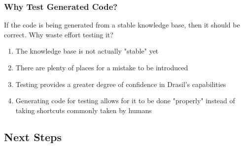 \documentclass{beamer}
\begin{document}
\begin{frame}
    \frametitle{Why Test Generated Code?}
    If the code is being generated from a stable knowledge base,
    then it should be correct. Why waste effort testing it?
    \begin{enumerate}
        \item<2-> The knowledge base is not actually "stable" yet
        \item<3-> There are plenty of places for a mistake to be introduced
        \item<4-> Testing provides a greater degree of confidence in
            Drasil's capabilities
        \item<5-> Generating code for testing allows for it to be done
            "properly" instead of taking shortcuts commonly taken by humans
    \end{enumerate}
\end{frame}

\subsection{Next Steps}
\end{document}
